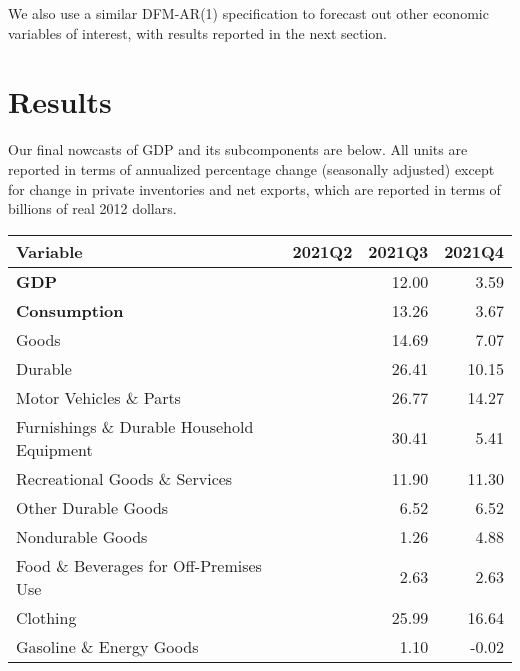 \documentclass[11pt, letterpaper]{article}\usepackage[]{graphicx}\usepackage[]{color}
\begin{document}
We also use a similar DFM-AR(1) specification to forecast out other economic variables of interest, with results reported in the next section.


\section{Results}
Our final nowcasts of GDP and its subcomponents are below. All units are reported in terms of annualized percentage change (seasonally adjusted) except for change in private inventories and net exports, which are reported in terms of billions of real 2012 dollars.
\begin{table}[H]
\centering
\begingroup\fontsize{10pt}{12pt}\selectfont
\begin{tabular}{lrrr}
  \hline
Variable & 2021Q2 & 2021Q3 & 2021Q4 \\ 
  \hline
\hspace{0mm} \textbf{GDP} &  & 12.00 & 3.59 \\ 
  \hspace{0mm} \textbf{Consumption} &  & 13.26 & 3.67 \\ 
  \hspace{8mm}  Goods &  & 14.69 & 7.07 \\ 
  \hspace{16mm}  Durable &  & 26.41 & 10.15 \\ 
  \hspace{24mm}  Motor Vehicles \& Parts &  & 26.77 & 14.27 \\ 
  \hspace{24mm}  Furnishings \& Durable Household Equipment &  & 30.41 & 5.41 \\ 
  \hspace{24mm}  Recreational Goods \& Services &  & 11.90 & 11.30 \\ 
  \hspace{24mm}  Other Durable Goods &  & 6.52 & 6.52 \\ 
  \hspace{16mm}  Nondurable Goods &  & 1.26 & 4.88 \\ 
  \hspace{24mm}  Food \& Beverages for Off-Premises Use &  & 2.63 & 2.63 \\ 
  \hspace{24mm}  Clothing &  & 25.99 & 16.64 \\ 
  \hspace{24mm}  Gasoline \& Energy Goods &  & 1.10 & -0.02 \\ 

\end{tabular}
\end{table}
\end{document}
